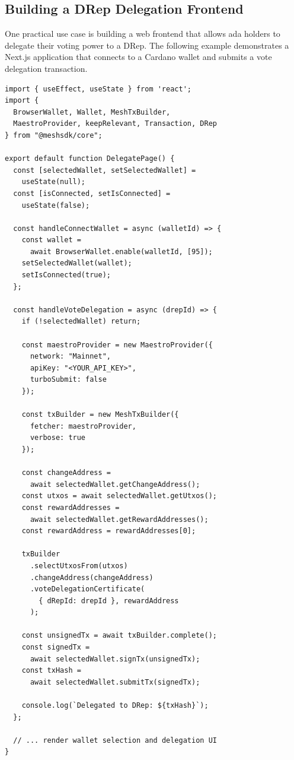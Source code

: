\subsection{Building a DRep Delegation Frontend}

One practical use case is building a web frontend that allows ada holders to delegate their voting power to a DRep. The following example demonstrates a Next.js application that connects to a Cardano wallet and submits a vote delegation transaction.

\begin{lstlisting}[caption=DRep Delegation Frontend with Next.js and MeshJS]
import { useEffect, useState } from 'react';
import {
  BrowserWallet, Wallet, MeshTxBuilder,
  MaestroProvider, keepRelevant, Transaction, DRep
} from "@meshsdk/core";

export default function DelegatePage() {
  const [selectedWallet, setSelectedWallet] =
    useState(null);
  const [isConnected, setIsConnected] =
    useState(false);

  const handleConnectWallet = async (walletId) => {
    const wallet =
      await BrowserWallet.enable(walletId, [95]);
    setSelectedWallet(wallet);
    setIsConnected(true);
  };

  const handleVoteDelegation = async (drepId) => {
    if (!selectedWallet) return;

    const maestroProvider = new MaestroProvider({
      network: "Mainnet",
      apiKey: "<YOUR_API_KEY>",
      turboSubmit: false
    });

    const txBuilder = new MeshTxBuilder({
      fetcher: maestroProvider,
      verbose: true
    });

    const changeAddress =
      await selectedWallet.getChangeAddress();
    const utxos = await selectedWallet.getUtxos();
    const rewardAddresses =
      await selectedWallet.getRewardAddresses();
    const rewardAddress = rewardAddresses[0];

    txBuilder
      .selectUtxosFrom(utxos)
      .changeAddress(changeAddress)
      .voteDelegationCertificate(
        { dRepId: drepId }, rewardAddress
      );

    const unsignedTx = await txBuilder.complete();
    const signedTx =
      await selectedWallet.signTx(unsignedTx);
    const txHash =
      await selectedWallet.submitTx(signedTx);

    console.log(`Delegated to DRep: ${txHash}`);
  };

  // ... render wallet selection and delegation UI
}
\end{lstlisting}

